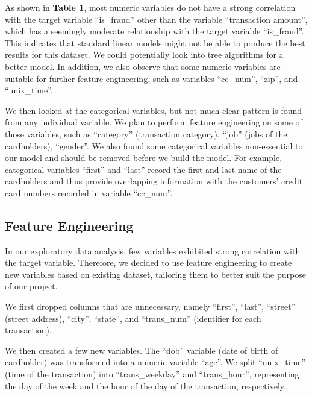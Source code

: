 \documentclass[sigconf, nonacm]{acmart}
\begin{document}
As shown in {\bfseries Table 1}, most numeric variables do not have a strong correlation with the target variable ``is\_fraud'' other than the variable ``transaction amount'', which has a seemingly moderate relationship with the target variable ``is\_fraud''. This indicates that standard linear models might not be able to produce the best results for this dataset. We could potentially look into tree algorithms for a better model. In addition, we also observe that some numeric variables are suitable for further feature engineering, such as variables ``cc\_num'', ``zip'', and ``unix\_time''.

We then looked at the categorical variables, but not much clear pattern is found from any individual variable. We plan to perform feature engineering on some of those variables, such as ``category'' (transaction category), ``job'' (jobs of the cardholders), ``gender''. We also found some categorical variables non-essential to our model and should be removed before we build the model. For example, categorical variables ``first'' and ``last'' record the first and last name of the cardholders and thus provide overlapping information with the customers' credit card numbers recorded in variable ``cc\_num''.



\subsection{Feature Engineering}
In our exploratory data analysis, few variables exhibited strong correlation with the target variable. Therefore, we decided to use feature engineering to create new variables based on existing dataset, tailoring them to better suit the purpose of our project. 

We first dropped columns that are unnecessary, namely ``first'', ``last'', ``street'' (street address), ``city'', ``state'', and ``trans\_num'' (identifier for each transaction). 

We then created a few new variables. The ``dob'' variable (date of birth of cardholder) was transformed into a numeric variable ``age''. We split ``unix\_time'' (time of the transaction) into ``trans\_weekday'' and ``trans\_hour'', representing the day of the week and the hour of the day of the transaction, respectively. 
\end{document}
